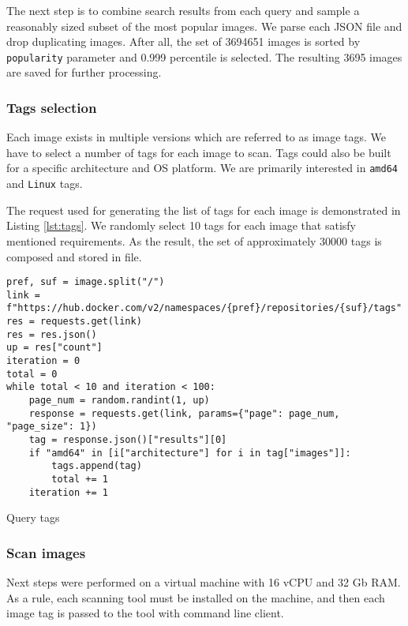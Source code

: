 The next step is to combine search results from each query and sample a reasonably sized subset of the most popular images. We parse each JSON file and drop duplicating images. After all, the set of 3694651 images is sorted by \texttt{popularity} parameter and 0.999 percentile is selected. The resulting 3695 images are saved for further processing.

\subsubsection{Tags selection}

Each image exists in multiple versions which are referred to as image tags. We have to select a number of tags for each image to scan. Tags could also be built for a specific architecture and OS platform. We are primarily interested in \texttt{amd64} and \texttt{Linux} tags. 

The request used for generating the list of tags for each image is demonstrated in Listing \ref{lst:tags}. We randomly select 10 tags for each image that satisfy mentioned requirements. As the result, the set of approximately 30000 tags is composed and stored in file.

\begin{listing}[htp]
    \centering
    \begin{minipage}{1\linewidth}
        \begin{verbatim}
pref, suf = image.split("/")
link = f"https://hub.docker.com/v2/namespaces/{pref}/repositories/{suf}/tags"
res = requests.get(link)
res = res.json()
up = res["count"]
iteration = 0
total = 0
while total < 10 and iteration < 100:
    page_num = random.randint(1, up)
    response = requests.get(link, params={"page": page_num, "page_size": 1})
    tag = response.json()["results"][0]
    if "amd64" in [i["architecture"] for i in tag["images"]]:
        tags.append(tag)
        total += 1
    iteration += 1
        \end{verbatim}
    \end{minipage}
    \caption{Query tags}
    \label{lst:tags}
\end{listing}

\subsubsection{Scan images}

Next steps were performed on a virtual machine with 16 vCPU and 32 Gb RAM. As a rule, each scanning tool must be installed on the machine, and then each image tag is passed to the tool with command line client.

